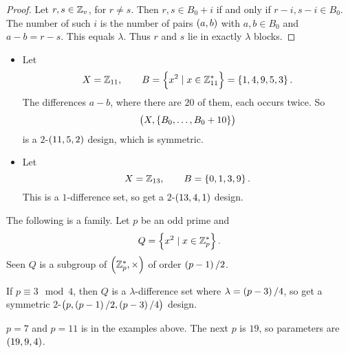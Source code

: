 \begin{proof}
Let $ r, s \in \mathbb{Z}_v $, for $ r \ne s $. Then $ r, s \in B_0 + i $ if and only if $ r - i, s - i \in B_0 $. The number of such $ i $ is the number of pairs $ \br{a, b} $ with $ a, b \in B_0 $ and $ a - b = r - s $. This equals $ \lambda $. Thus $ r $ and $ s $ lie in exactly $ \lambda $ blocks.
\end{proof}

\begin{example*}
\hfill
\begin{itemize}
\item Let
$$ X = \Z_{11}, \qquad B = \cbr{x^2 \mid x \in \Z_{11}^*} = \cbr{1, 4, 9, 5, 3}. $$
The differences $ a - b $, where there are $ 20 $ of them, each occurs twice. So
$$ \br{X, \cbr{B_0, \dots, B_0 + 10}} $$
is a $ 2 $-$ \br{11, 5, 2} $ design, which is symmetric.
\item Let
$$ X = \Z_{13}, \qquad B = \cbr{0, 1, 3, 9}. $$
This is a $ 1 $-difference set, so get a $ 2 $-$ \br{13, 4, 1} $ design.
\end{itemize}
\end{example*}

\pagebreak

The following is a family. Let $ p $ be an odd prime and
$$ Q = \cbr{x^2 \mid x \in \Z_p^*}. $$
Seen $ Q $ is a subgroup of $ \br{\Z_p^*, \times} $ of order $ \br{p - 1} / 2 $.

\begin{proposition}
If $ p \equiv 3 \mod 4 $, then $ Q $ is a $ \lambda $-difference set where $ \lambda = \br{p - 3} / 4 $, so get a symmetric $ 2 $-$ \br{p, \br{p - 1} / 2, \br{p - 3} / 4} $ design.
\end{proposition}

\begin{example*}
$ p = 7 $ and $ p = 11 $ is in the examples above. The next $ p $ is $ 19 $, so parameters are $ \br{19, 9, 4} $.
\end{example*}

